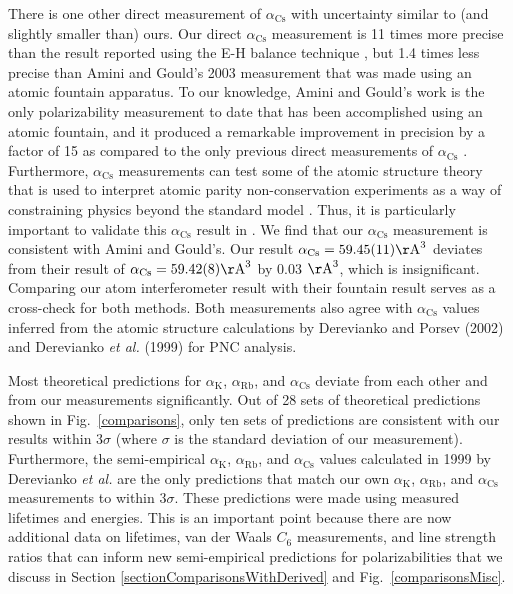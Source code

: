 \documentclass[twocolumn,pra,showpacs,superscriptaddress,longbibliography]{revtex4-1}   %
\newcommand{\figref}[1]{Fig.~\ref{#1}}
\newcommand{\ak}{\alpha_{\textrm{K}}}
\newcommand{\arb}{\alpha_{\textrm{Rb}}}
\newcommand{\acs}{\alpha_{\textrm{Cs}}}
\newcommand{\etalspace}{\textit{et al. }}
\newcommand{\AAA}{\mathrm{\AA}}
\begin{document}
There is one other direct measurement of $\acs$ with uncertainty similar to (and slightly smaller than) ours.  Our direct $\acs$ measurement is 11 times more precise than the result reported using the E-H balance technique \cite{Molof1974a}, but 1.4 times less precise than Amini and Gould's 2003 measurement \cite{Amini2003} that was made using an atomic fountain apparatus.
To our knowledge, Amini and Gould's work is the only polarizability measurement to date that has been accomplished using an atomic fountain, and it produced a remarkable improvement in precision by a factor of 15 as compared to the only previous direct measurements of $\acs$ \cite{Molof1974a,Hall1974}.  Furthermore, $\acs$ measurements can test some of the atomic structure theory that is used to interpret atomic parity non-conservation experiments as a way of constraining physics beyond the standard model \cite{Blundell1992,Cho1997,Derevianko2001,Porsev2009}. Thus, it is particularly important to validate this $\acs$ result in \cite{Amini2003}.  We find that our $\acs$ measurement is consistent with Amini and Gould's.  Our result $\acs = 59.45(11) \AAA^3$ deviates from their result of $\acs = 59.42(8) \AAA^3$ by 0.03 $\AAA^3$, which is insignificant.  Comparing our atom interferometer result with their fountain result serves as a cross-check for both methods.
Both measurements also agree with $\acs$ values inferred from the atomic structure calculations by Derevianko and Porsev (2002) \cite{Derevianko2001} and Derevianko \etalspace (1999) \cite{Derevianko1998} for PNC analysis.




Most theoretical predictions for $\ak$, $\arb$, and $\acs$ deviate from each other and from our measurements significantly.   Out of 28 sets of theoretical predictions shown in \figref{comparisons}, only ten sets of predictions \cite{Derevianko1998,Derevianko2001,Iskrenova-Tchoukova2007,Safronova2008,Safronova2011,
Nandy2012,Jiang2013,Sahoo2013,
Safronova2013,Borschevsky2013} are consistent with our results within 3$\sigma$ (where $\sigma$ is the standard deviation of our measurement). Furthermore, the semi-empirical $\ak$, $\arb$, and $\acs$ values calculated in 1999 by Derevianko \etalspace are the only predictions that match our own $\ak$, $\arb$, and $\acs$ measurements
to within 3$\sigma$. These predictions were made using measured lifetimes and energies.  This is an important point because there are now additional data on lifetimes, van der Waals $C_6$ measurements, and line strength ratios that can inform new semi-empirical predictions for polarizabilities that we discuss in Section \ref{sectionComparisonsWithDerived} and \figref{comparisonsMisc}.
\end{document}
